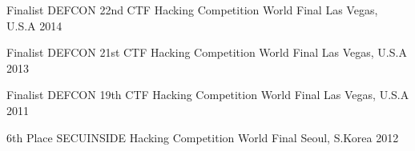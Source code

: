 



\begin{cvhonors}

  \cvhonor
    {Finalist} %
    {DEFCON 22nd CTF Hacking Competition World Final} %
    {Las Vegas, U.S.A} %
    {2014} %

  \cvhonor
    {Finalist} %
    {DEFCON 21st CTF Hacking Competition World Final} %
    {Las Vegas, U.S.A} %
    {2013} %

  \cvhonor
    {Finalist} %
    {DEFCON 19th CTF Hacking Competition World Final} %
    {Las Vegas, U.S.A} %
    {2011} %

  \cvhonor
    {6th Place} %
    {SECUINSIDE Hacking Competition World Final} %
    {Seoul, S.Korea} %
    {2012} %

\end{cvhonors}




